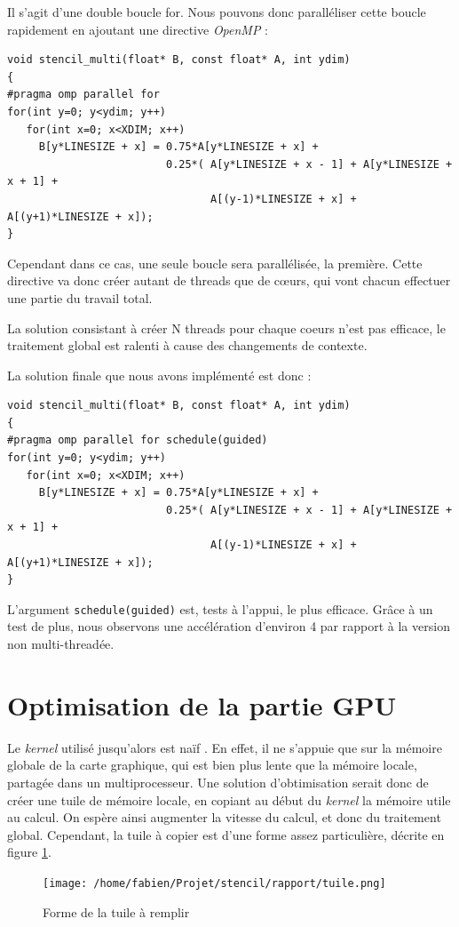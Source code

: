 \documentclass{article}
\begin{document}
Il s'agit d'une double boucle for.
Nous pouvons donc paralléliser cette boucle rapidement en ajoutant une directive \textit{OpenMP} :
\begin{verbatim}
void stencil_multi(float* B, const float* A, int ydim)
{
#pragma omp parallel for
for(int y=0; y<ydim; y++)
   for(int x=0; x<XDIM; x++)
     B[y*LINESIZE + x] = 0.75*A[y*LINESIZE + x] +
                         0.25*( A[y*LINESIZE + x - 1] + A[y*LINESIZE + x + 1] +
                                A[(y-1)*LINESIZE + x] + A[(y+1)*LINESIZE + x]);
}
\end{verbatim}
Cependant dans ce cas, une seule boucle sera parallélisée, la première.
Cette directive va donc créer autant de threads que de c\oe{}urs, qui vont chacun effectuer une partie du travail total.

La solution consistant à créer N threads pour chaque coeurs n'est pas efficace, le traitement global est ralenti à cause des changements de contexte.

La solution finale que nous avons implémenté est donc :
\begin{verbatim}
void stencil_multi(float* B, const float* A, int ydim)
{
#pragma omp parallel for schedule(guided)
for(int y=0; y<ydim; y++)
   for(int x=0; x<XDIM; x++)
     B[y*LINESIZE + x] = 0.75*A[y*LINESIZE + x] +
                         0.25*( A[y*LINESIZE + x - 1] + A[y*LINESIZE + x + 1] +
                                A[(y-1)*LINESIZE + x] + A[(y+1)*LINESIZE + x]);
}
\end{verbatim}

L'argument \verb+schedule(guided)+ est, tests à l'appui, le plus efficace.
Grâce à un test de plus, nous observons une accélération d'environ 4 par rapport à la version non multi-threadée.
\section{Optimisation de la partie GPU}
Le \textit{kernel} utilisé jusqu'alors est \og naïf \fg. En effet, il ne s'appuie que sur la mémoire globale de la carte graphique, qui est bien plus lente que la mémoire locale, partagée dans un multiprocesseur. 
Une solution d'obtimisation serait donc de créer une \og tuile \fg de mémoire locale, en copiant au début du \textit{kernel} la mémoire utile au calcul. 
On espère ainsi augmenter la vitesse du calcul, et donc du traitement global.
Cependant, la \og tuile \fg à copier est d'une forme assez particulière, décrite en figure \ref{tuile}.
\begin{figure}[htp]
\texttt{[image: /home/fabien/Projet/stencil/rapport/tuile.png]}
\caption{Forme de la tuile à remplir}
\label{tuile}
\end{figure}
\end{document}
